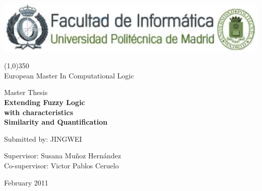 
\begin{titlepage}
\centering

\includegraphics[width=1\textwidth]{images/logofi.png}
\begin{center}
\line(1,0){350}\\
European Master In Computational Logic
\end{center}

\vfill

\vfill


{\Large Master Thesis}\\
\vspace{1cm}
{\huge {\sffamily\bfseries Extending Fuzzy Logic } } \\
\vspace{0.3cm}
{\huge{ \sffamily\bfseries with characteristics } } \\
\vspace{0.4cm}
{\huge{ \sffamily\bfseries Similarity and Quantification} }


\vfill

{\Large Submitted by: JINGWEI }

\vspace{1cm}
{\Large Supervisor: Susana Mu\~noz Hern\'andez }\\
{\Large Co-supervisor: Victor Pablos Ceruelo } \\
\vspace{1cm}

{\Large February 2011}
\clearemptydoublepage

\end{titlepage}